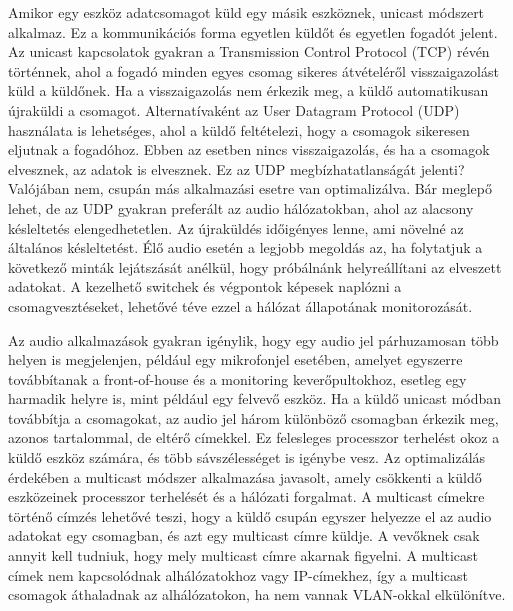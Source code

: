 Amikor egy eszköz adatcsomagot küld egy másik eszköznek, unicast módszert alkalmaz. 
Ez a kommunikációs forma egyetlen küldőt és egyetlen fogadót jelent. Az unicast 
kapcsolatok gyakran a Transmission Control Protocol (TCP) révén történnek, ahol a
fogadó minden egyes csomag sikeres átvételéről visszaigazolást küld a küldőnek. Ha
a visszaigazolás nem érkezik meg, a küldő automatikusan újraküldi a csomagot. 
Alternatívaként az User Datagram Protocol (UDP) használata is lehetséges, ahol a
küldő feltételezi, hogy a csomagok sikeresen eljutnak a fogadóhoz. Ebben az esetben
nincs visszaigazolás, és ha a csomagok elvesznek, az adatok is elvesznek.
Ez az UDP megbízhatatlanságát jelenti? Valójában nem, csupán más alkalmazási 
esetre van optimalizálva. Bár meglepő lehet, de az UDP gyakran preferált az 
audio hálózatokban, ahol az alacsony késleltetés elengedhetetlen. Az újraküldés
időigényes lenne, ami növelné az általános késleltetést. Élő audio esetén a legjobb
megoldás az, ha folytatjuk a következő minták lejátszását anélkül, hogy próbálnánk
helyreállítani az elveszett adatokat. A kezelhető switchek és végpontok képesek
naplózni a csomagvesztéseket, lehetővé téve ezzel a hálózat állapotának monitorozását.

Az audio alkalmazások gyakran igénylik, hogy egy audio jel párhuzamosan több helyen
is megjelenjen, például egy mikrofonjel esetében, amelyet egyszerre továbbítanak
a front-of-house és a monitoring keverőpultokhoz, esetleg egy harmadik helyre
is, mint például egy felvevő eszköz. Ha a küldő unicast módban továbbítja a csomagokat,
az audio jel három különböző csomagban érkezik meg, azonos tartalommal, de eltérő
címekkel. Ez felesleges processzor terhelést okoz a küldő eszköz számára, és több
sávszélességet is igénybe vesz. Az optimalizálás érdekében a multicast módszer
alkalmazása javasolt, amely csökkenti a küldő eszközeinek processzor terhelését és
a hálózati forgalmat. A multicast címekre történő címzés lehetővé teszi, hogy a
küldő csupán egyszer helyezze el az audio adatokat egy csomagban, és azt egy multicast
címre küldje. A vevőknek csak annyit kell tudniuk, hogy mely multicast címre
akarnak figyelni. A multicast címek nem kapcsolódnak alhálózatokhoz vagy
IP-címekhez, így a multicast csomagok áthaladnak az alhálózatokon, ha nem
vannak VLAN-okkal elkülönítve. 


